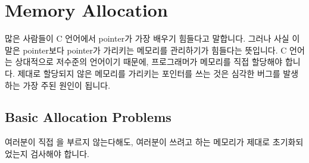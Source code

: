 \chapter{Memory Allocation}	\label{chap:memalloc}

많은 사람들이 C 언어에서 pointer가 가장 배우기 힘들다고 말합니다.
그러나 사실 이 말은 pointer보다 pointer가 가리키는 메모리를 관리하기가
힘들다는 뜻입니다. C 언어는 상대적으로 저수준의 언어이기 때문에,
프로그래머가 메모리를 직접 할당해야 합니다.
제대로 할당되지 않은 메모리를 가리키는 포인터를 쓰는 것은 심각한 버그를
발생하는 가장 주된 원인이 됩니다.

\section{Basic Allocation Problems}
여러분이 직접 을 부르지 않는다해도, 여러분이 쓰려고 하는 메모리가
제대로 초기화되었는지 검사해야 합니다.

